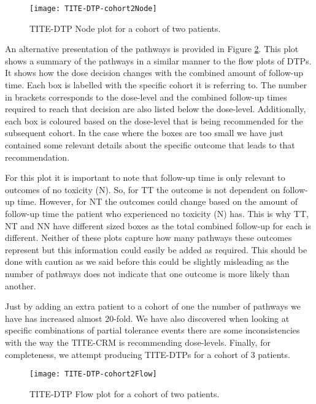 \begin{figure}[h!]
	\centering
	\caption{TITE-DTP Node plot for a cohort of two patients.}
	\label{fig_tite-dtp:TITEDTP-cohort2-node}
	\texttt{[image: TITE-DTP-cohort2Node]}
\end{figure}


An alternative presentation of the pathways is provided in Figure \ref{fig_tite-dtp:TITEDTP-cohort2-flow}. This plot shows a summary of the pathways in a similar manner to the flow plots of DTPs. It shows how the dose decision changes with the combined amount of follow-up time. Each box is labelled with the specific cohort it is referring to. The number in brackets corresponds to the dose-level and the combined follow-up times required to reach that decision are also listed below the dose-level. Additionally, each box is coloured based on the dose-level that is being recommended for the subsequent cohort. In the case where the boxes are too small we have just contained some relevant details about the specific outcome that leads to that recommendation. 

For this plot it is important to note that follow-up time is only relevant to outcomes of no toxicity (N). So, for TT the outcome is not dependent on follow-up time. However, for NT the outcomes could change based on the amount of follow-up time the patient who experienced no toxicity (N) has. This is why TT, NT and NN have different sized boxes as the total combined follow-up for each is different. Neither of these plots capture how many pathways these outcomes represent but this information could easily be added as required. This should be done with caution as we said before this could be slightly misleading as the number of pathways does not indicate that one outcome is more likely than another. 

Just by adding an extra patient to a cohort of one the number of pathways we have has increased almost 20-fold. We have also discovered when looking at specific combinations of partial tolerance events there are some inconsistencies with the way the TITE-CRM is recommending dose-levels. Finally, for completeness, we attempt producing TITE-DTPs for a cohort of 3 patients.   


\begin{figure}[H]
	\centering
	\caption{TITE-DTP Flow plot for a cohort of two patients.}
	\label{fig_tite-dtp:TITEDTP-cohort2-flow}
	\texttt{[image: TITE-DTP-cohort2Flow]}
\end{figure}



